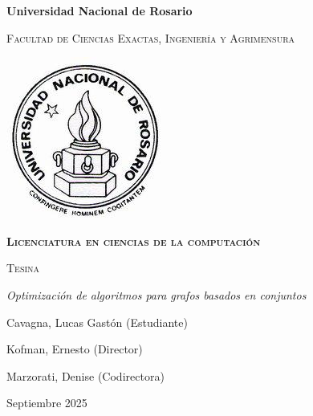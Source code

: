 \documentclass[10pt]{book}
\makeatletter
\renewcommand\tableofcontents{%
	\null\hfill\textbf{\Huge\contentsname}\hfill\null\par
	\@mkboth{\MakeUppercase\contentsname}{\MakeUppercase\contentsname}%
	\@starttoc{toc}%
}
\makeatother
\begin{document}
\begin{titlepage}
	\centering
	{\bfseries\LARGE Universidad Nacional de Rosario \par}
	\vspace{0.5cm}
	{\scshape\Large Facultad de Ciencias Exactas, Ingeniería y Agrimensura \par}
	\vspace{1cm}
	\begin{center}
		\includegraphics[scale=2.3]{figures/LogoUnr.jpg}
	\end{center}
	\vspace{0.5cm}
	{\scshape\Huge\bf Licenciatura en ciencias de la computación\par}
	\vspace{0.5cm}
	{\scshape\Huge Tesina \par}
	\vspace{1cm}
	{\itshape\Huge Optimización de algoritmos para grafos basados en conjuntos\par}
	\vspace{1cm}
	{\Large Cavagna, Lucas Gastón (Estudiante) \par}
	{\Large Kofman, Ernesto (Director) \par}
	{\Large Marzorati, Denise (Codirectora) \par}
	\vspace{0.15cm} 
	{\Large Septiembre 2025\par}
\end{titlepage}


\tableofcontents


\let\cleardoublepage\clearpage




%
%
%
%
%






\appendix
\renewcommand{\thechapter}{Apéndice~\Alph{chapter}}




 
\end{document}
